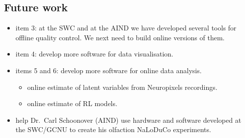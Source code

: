 \subsection{Future work}

\begin{itemize}

    \item item 3: at the SWC and at the AIND we have developed several tools for offline quality control. We next need to build online versions of them.

    \item item 4: develop more software for data visualisation.

    \item items 5 and 6: develop more software for online data analysis.

    \begin{itemize}

        \item online estimate of latent variables from Neuropixels recordings.

        \item online estimate of RL models.

    \end{itemize}

    \item help Dr.~Carl Schoonover (AIND) use hardware and software developed at the SWC/GCNU to create his olfaction NaLoDuCo experiments.

\end{itemize}
